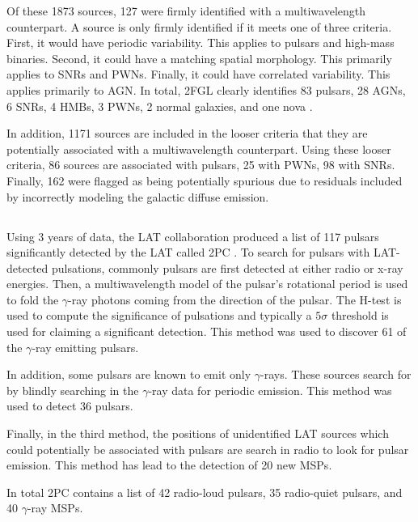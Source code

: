 Of these 1873 sources, 127 were firmly identified with a multiwavelength
counterpart.  A source is only firmly identified if it meets one of three
criteria. First, it would have periodic variability.  This applies to
pulsars and high-mass binaries.  Second, it could have a matching spatial
morphology. This primarily applies to \acp{SNR} and \acp{PWN}. Finally,
it could have correlated variability. This applies primarily to \ac{AGN}.
In total, \ac{2FGL} clearly identifies 83 pulsars, 28 \acp{AGN}, 6
\acp{SNR}, 4 \acp{HMB}, 3 \acp{PWN}, 2 normal galaxies, and one nova
\cite{nolan_2012_fermi-large}.

In addition, 1171 sources are included in the looser criteria that
they are potentially associated with a multiwavelength counterpart.
Using these looser criteria, 86 sources are associated with pulsars, 25
with \acp{PWN},  98 with \acp{SNR}.  Finally, 162 were flagged as being
potentially spurious due to residuals included by incorrectly modeling
the galactic diffuse emission.

\subsection{}
\subseclabel{2pc}

Using 3 years of data, the \ac{LAT} collaboration produced a
list of 117 pulsars significantly detected by the \ac{LAT} called
\acf{2PC} \citep{abdo_2013a_second-fermi}.  To search for pulsars with
\ac{LAT}-detected pulsations, commonly pulsars are first detected at
either radio or x-ray energies. Then, a multiwavelength model of the
pulsar's rotational period is used to fold the $\gamma$-ray photons
coming from the direction of the pulsar.  The H-test is used to compute
the significance of pulsations \citep{de-jager_1989a_poweful-periodic}
and typically a $5\sigma$ threshold is used for claiming a significant
detection.  This method was used to discover 61 of the $\gamma$-ray
emitting pulsars.

In addition, some pulsars are known to emit only $\gamma$-rays.
These sources search for by blindly searching in the $\gamma$-ray data
for periodic emission. This method was used to detect 36 pulsars.

Finally, in the third method, the positions of unidentified \ac{LAT}
sources which could potentially be associated with pulsars are search in
radio to look for pulsar emission. This method has lead to the detection
of 20 new \acp{MSP}.

In total \ac{2PC} contains a list of 42 radio-loud pulsars, 35 radio-quiet
pulsars, and 40 $\gamma$-ray \acp{MSP}.

